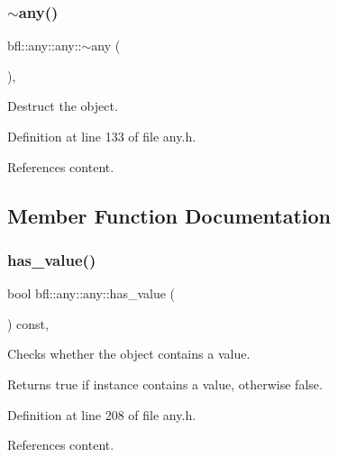 \subsubsection{\texorpdfstring{$\sim$any()}{~any()}}
{\footnotesize\ttfamily bfl\+::any\+::any\+::$\sim$any (\begin{DoxyParamCaption}{ }\end{DoxyParamCaption})\hspace{0.3cm}{\ttfamily [inline]}, {\ttfamily [noexcept]}}



Destruct the object. 



Definition at line 133 of file any.\+h.



References content.



\subsection{Member Function Documentation}
\mbox{\label{classbfl_1_1any_1_1any_a6ec222b8ae338c3392b0538ec1d94766}} 
\subsubsection{\texorpdfstring{has\+\_\+value()}{has\_value()}}
{\footnotesize\ttfamily bool bfl\+::any\+::any\+::has\+\_\+value (\begin{DoxyParamCaption}{ }\end{DoxyParamCaption}) const\hspace{0.3cm}{\ttfamily [inline]}, {\ttfamily [noexcept]}}



Checks whether the object contains a value. 

\begin{DoxyReturn}{Returns}
true if instance contains a value, otherwise false. 
\end{DoxyReturn}


Definition at line 208 of file any.\+h.



References content.

\mbox{\label{classbfl_1_1any_1_1any_a067d769bffdf2782e8d1dc080f66d948}} 
